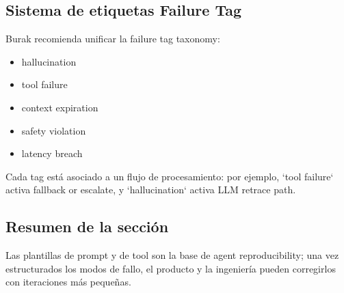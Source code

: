 \subsection{Sistema de etiquetas Failure Tag}

Burak recomienda unificar la failure tag taxonomy:

\begin{itemize}
    \item hallucination
    \item tool failure
    \item context expiration
    \item safety violation
    \item latency breach
\end{itemize}

Cada tag está asociado a un flujo de procesamiento: por ejemplo, `tool failure` activa fallback or escalate, y `hallucination` activa LLM retrace path.

\subsection{Resumen de la sección}

Las plantillas de prompt y de tool son la base de agent reproducibility; una vez estructurados los modos de fallo, el producto y la ingeniería pueden corregirlos con iteraciones más pequeñas.

